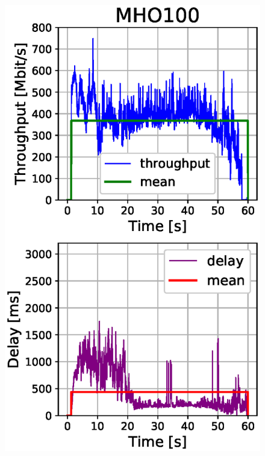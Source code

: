 \documentclass[conference,10pt]{IEEEtran}
\begin{document}
\begin{enumerate}
\begin{figure}[!t]
\begin{minipage}{.245\textwidth}
		\includegraphics[width=\linewidth, keepaspectratio]{images/results_mho_100.eps}
		\label{fig:test2}
	\end{minipage}
	\begin{minipage}{.245\textwidth}
		\centering

\end{minipage}
\end{figure}
\end{enumerate}
\end{document}
